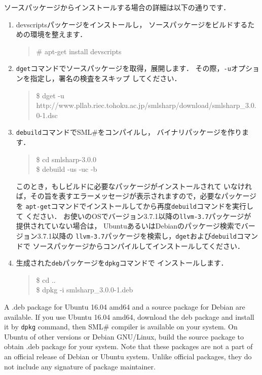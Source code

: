 \documentclass{jbook}
\newcommand{\smlsharp}{SML\#}
\newcommand{\version}{3.0.0}
\newenvironment{program}{\begin{quote}\begin{tt}}%
                        {\end{tt}\end{quote}}
\begin{document}
	ソースパッケージからインストールする場合の詳細は以下の通りです．
\begin{enumerate}
\item
	devscriptsパッケージをインストールし，
ソースパッケージをビルドするための環境を整えます．
\begin{program}
\# apt-get install devscripts
\end{program}
\item
	{\tt dget}コマンドでソースパッケージを取得，展開します．
	その際，{\tt -u}オプションを指定し，署名の検査をスキップ
してください．
\begin{program}
\$ dget -u http://www.pllab.riec.tohoku.ac.jp/smlsharp/download/smlsharp\_\version-1.dsc
\end{program}
\item
	{\tt debuild}コマンドで\smlsharp{}をコンパイルし，
バイナリパッケージを作ります．
\begin{program}
\$ cd smlsharp-\version\\
\$ debuild -us -uc -b
\end{program}
	このとき，もしビルドに必要なパッケージがインストールされて
いなければ，その旨を表すエラーメッセージが表示されますので，必要なパッケージを
{\tt apt-get}コマンドでインストールしてから再度{\tt debuild}コマンドを実行して
ください．
	お使いのOSでバージョン3.7.1以降の{\tt llvm-3.7}パッケージが
提供されていない場合は，
UbuntuあるいはDebianのパッケージ検索でバージョン3.7.1以降の
{\tt llvm-3.7}パッケージを検索し，{\tt dget}および{\tt debuild}コマンドで
ソースパッケージからコンパイルしてインストールしてください．
\item
	生成された{\tt deb}パッケージを{\tt dpkg}コマンドで
インストールします．
\begin{program}
\$ cd ..\\
\$ dpkg -i smlsharp\_\version-1.deb
\end{program}
\end{enumerate}

\else%

	A \mbox{.deb} package for Ubuntu 16.04 amd64 and
a source package for Debian are available.
	If you use Ubuntu 16.04 amd64, download the \mbox{deb} package
and install it by {\tt dpkg} command, then 
\smlsharp{} compiler is available on your system.
	On Ubuntu of other versions or Debian GNU/Linux, build the
source package to obtain \mbox{.deb} package for your system.
	Note that these packages are not a part of an official
release of Debian or Ubuntu system.
	Unlike official packages, they do not include any signature of
package maintainer.
\end{document}
